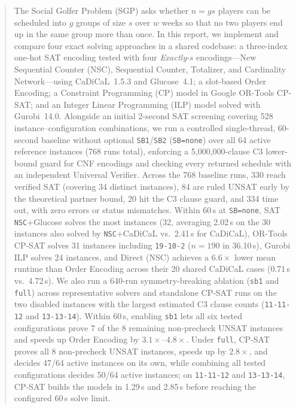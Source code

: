 \documentclass[a4paper,fleqn]{cas-sc}
\begin{document}
\begin{abstract}
The Social Golfer Problem (SGP) asks whether $n = gs$ players can be scheduled into $g$ groups of size $s$ over $w$ weeks so that no two players end up in the same group more than once. In this report, we implement and compare four exact solving approaches in a shared codebase: a three-index one-hot SAT encoding tested with four \textit{Exactly}-$s$ encodings---New Sequential Counter (NSC), Sequential Counter, Totalizer, and Cardinality Network---using CaDiCaL~1.5.3 and Glucose~4.1; a slot-based Order Encoding; a Constraint Programming (CP) model in Google OR-Tools CP-SAT; and an Integer Linear Programming (ILP) model solved with Gurobi~14.0. Alongside an initial 2-second SAT screening covering 528 instance--configuration combinations, we run a controlled single-thread, 60-second baseline without optional \texttt{SB1}/\texttt{SB2} (\texttt{SB=none}) over all 64 active reference instances (768 runs total), enforcing a 5{,}000{,}000-clause C3 lower-bound guard for CNF encodings and checking every returned schedule with an independent Universal Verifier. Across the 768 baseline runs, 330 reach verified SAT (covering 34 distinct instances), 84 are ruled UNSAT early by the theoretical partner bound, 20 hit the C3 clause guard, and 334 time out, with zero errors or status mismatches. Within 60\,s at \texttt{SB=none}, SAT \texttt{NSC}+Glucose solves the most instances (32, averaging 2.02\,s on the 30 instances also solved by \texttt{NSC}+CaDiCaL vs.\ 2.41\,s for CaDiCaL), OR-Tools CP-SAT solves 31 instances including \texttt{19-10-2} ($n=190$ in 36.10\,s), Gurobi ILP solves 24 instances, and Direct (NSC) achieves a $6.6\times$ lower mean runtime than Order Encoding across their 20 shared CaDiCaL cases (0.71\,s vs.\ 4.72\,s). We also run a 640-run symmetry-breaking ablation (\texttt{sb1} and \texttt{full}) across representative solvers and standalone CP-SAT runs on the two disabled instances with the largest estimated C3 clause counts (\texttt{11-11-12} and \texttt{13-13-14}). Within 60\,s, enabling \texttt{sb1} lets all six tested configurations prove 7 of the 8 remaining non-precheck UNSAT instances and speeds up Order Encoding by $3.1\times$--$4.8\times$. Under \texttt{full}, CP-SAT proves all 8 non-precheck UNSAT instances, speeds up by $2.8\times$, and decides 47/64 active instances on its own, while combining all tested configurations decides 50/64 active instances; on \texttt{11-11-12} and \texttt{13-13-14}, CP-SAT builds the models in 1.29\,s and 2.85\,s before reaching the configured 60\,s solve limit.
\end{abstract}
\end{document}

